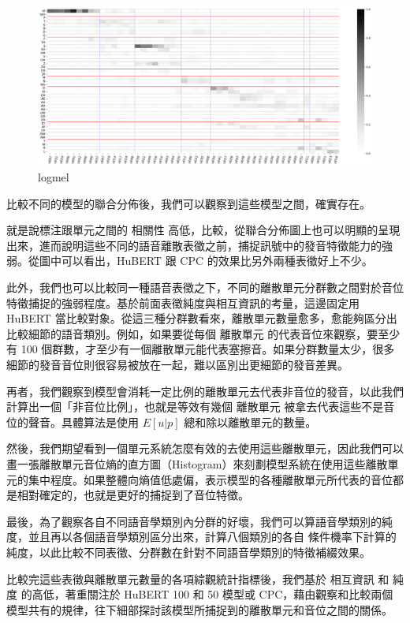 {\begin{figure}
    \centering
    \includegraphics[width=1\linewidth]{figures/logmel50.png}
    \caption{logmel}
    \label{fig:enter-label}
\end{figure}

}

        比較不同的模型的聯合分佈後，我們可以觀察到這些模型之間，確實存在。

        就是說標注跟單元之間的 相關性 高低，比較，從聯合分佈圖上也可以明顯的呈現出來，進而說明這些不同的語音離散表徵之前，捕捉訊號中的發音特徵能力的強弱。從圖中可以看出，HuBERT 跟 CPC 的效果比另外兩種表徵好上不少。

        此外，我們也可以比較同一種語音表徵之下，不同的離散單元分群數之間對於音位特徵捕捉的強弱程度。基於前面表徵純度與相互資訊的考量，這邊固定用 HuBERT 當比較對象。從這三種分群數看來，離散單元數量愈多，愈能夠區分出比較細節的語音類別。例如，如果要從每個 離散單元 的代表音位來觀察，要至少有 100 個群數，才至少有一個離散單元能代表塞擦音。如果分群數量太少，很多細節的發音音位則很容易被放在一起，難以區別出更細節的發音差異。

        再者，我們觀察到模型會消耗一定比例的離散單元去代表非音位的發音，以此我們計算出一個「非音位比例」，也就是等效有幾個 離散單元 被拿去代表這些不是音位的聲音。具體算法是使用 $E [ u | p ] $  總和除以離散單元的數量。

        然後，我們期望看到一個單元系統怎麼有效的去使用這些離散單元，因此我們可以畫一張離散單元音位熵的直方圖（Histogram）來刻劃模型系統在使用這些離散單元的集中程度。如果整體向熵值低處偏，表示模型的各種離散單元所代表的音位都是相對確定的，也就是更好的捕捉到了音位特徵。

        最後，為了觀察各自不同語音學類別內分群的好壞，我們可以算語音學類別的純度，並且再以各個語音學類別區分出來，計算八個類別的各自 條件機率下計算的 純度，以此比較不同表徵、分群數在針對不同語音學類別的特徵補綴效果。

        比較完這些表徵與離散單元數量的各項綜觀統計指標後，我們基於 相互資訊 和 純度 的高低，著重關注於 HuBERT 100 和 50 模型或 CPC，藉由觀察和比較兩個模型共有的規律，往下細部探討該模型所捕捉到的離散單元和音位之間的關係。

